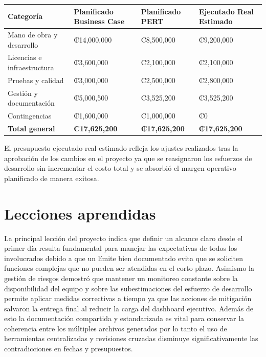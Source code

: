 \documentclass[11pt,spanish]{article}
\begin{document}
\begin{table}[H]
\centering
\begin{tabularx}{\textwidth}{p{5cm} Y Y Y}
\toprule
\textbf{Categoría} & \textbf{Planificado Business Case} & \textbf{Planificado PERT} & \textbf{Ejecutado Real Estimado} \\
\midrule
Mano de obra y desarrollo & ₡14,000,000 & ₡8,500,000 & ₡9,200,000 \\
Licencias e infraestructura & ₡3,600,000 & ₡2,100,000 & ₡2,100,000 \\
Pruebas y calidad & ₡3,000,000 & ₡2,500,000 & ₡2,800,000 \\
Gestión y documentación & ₡5,000,500 & ₡3,525,200 & ₡3,525,200 \\
Contingencias & ₡1,600,000 & ₡1,000,000 & ₡0 \\
\midrule
\textbf{Total general} & \textbf{₡17,625,200} & \textbf{₡17,625,200} & \textbf{₡17,625,200} \\
\bottomrule
\end{tabularx}
\end{table}

El presupuesto ejecutado real estimado refleja los ajustes realizados tras la aprobación de los cambios en el proyecto ya que se reasignaron los esfuerzos de desarrollo sin incrementar el costo total y se absorbió el margen operativo planificado de manera exitosa. 

\section{Lecciones aprendidas}

La principal lección del proyecto indica que definir un alcance claro desde el primer día resulta fundamental para manejar las expectativas de todos los involucrados debido a que un límite bien documentado evita que se soliciten funciones complejas que no pueden ser atendidas en el corto plazo. Asimismo la gestión de riesgos demostró que mantener un monitoreo constante sobre la disponibilidad del equipo y sobre las subestimaciones del esfuerzo de desarrollo permite aplicar medidas correctivas a tiempo ya que las acciones de mitigación salvaron la entrega final al reducir la carga del dashboard ejecutivo. Además de esto la documentación compartida y estandarizada es vital para conservar la coherencia entre los múltiples archivos generados por lo tanto el uso de herramientas centralizadas y revisiones cruzadas disminuye significativamente las contradicciones en fechas y presupuestos.
\end{document}
